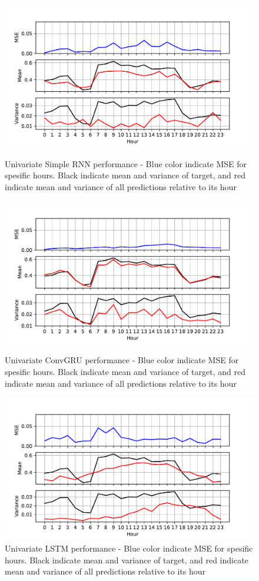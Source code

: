 \documentclass
[twocolumn,
secnumarabic,
nobibnotes,
aps,
prl,
reprint,
groupedaddress,
amsmath,
amssymb,
]{revtex4-2}
\begin{document}
\begin{figure}
  \includegraphics[width=\columnwidth]{figures/univariate_hourly_stats_RNN.pdf}
  \caption{\label{fig:univariate_hourly_stats_RNN} Univariate Simple RNN performance - Blue color indicate MSE for spesific hours. Black indicate mean and variance of target, and red indicate mean and variance of all predictions relative to its hour}
  \includegraphics[width=\columnwidth]{figures/univariate_hourly_stats_convGRU.pdf}
  \caption{\label{fig:univariate_hourly_stats_convGRU} Univariate ConvGRU performance - Blue color indicate MSE for spesific hours. Black indicate mean and variance of target, and red indicate mean and variance of all predictions relative to its hour}
  \includegraphics[width=\columnwidth]{figures/univariate_hourly_stats_LSTM.pdf}
  \caption{\label{fig:univariate_hourly_stats_LSTM} Univariate LSTM performance - Blue color indicate MSE for spesific hours. Black indicate mean and variance of target, and red indicate mean and variance of all predictions relative to its hour}
\end{figure}
\end{document}
